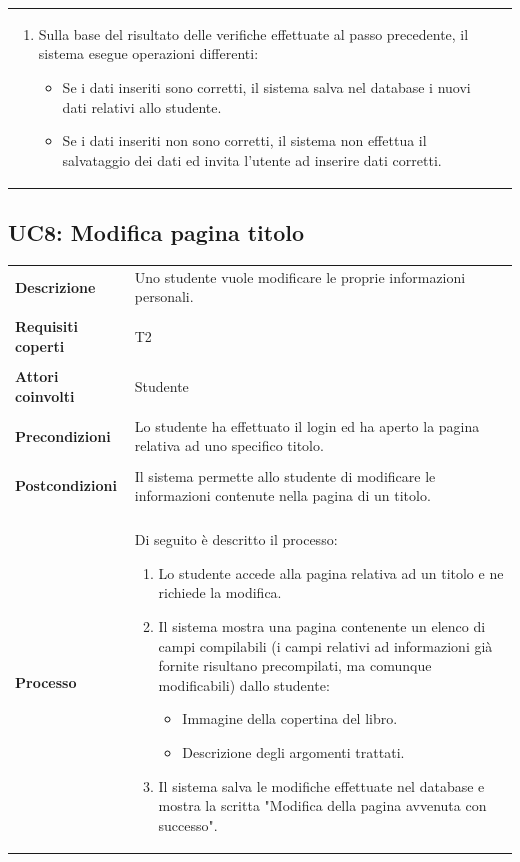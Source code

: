 \documentclass[10pt,a4paper]{article}
\begin{document}
\begin{tabular}{lp{}}
\begin{enumerate}
			\item Sulla base del risultato delle verifiche effettuate al passo precedente, il sistema esegue operazioni differenti:
			\begin{itemize}
				\item Se i dati inseriti sono corretti, il sistema salva nel database i nuovi dati relativi allo studente.
				\item Se i dati inseriti non sono corretti, il sistema non effettua il salvataggio dei dati ed invita l'utente ad inserire dati corretti.
			\end{itemize}
		\end{enumerate}
	\end{tabular}

	\subsection{UC8: Modifica pagina titolo}
	\begin{tabular}{lp{}}
		\textbf{Descrizione}&Uno studente vuole modificare le proprie informazioni personali.\\
		\\
		\textbf{Requisiti coperti}&T2\\
		\\
		\textbf{Attori coinvolti}&Studente\\
		\\
		\textbf{Precondizioni}&Lo studente ha effettuato il login ed ha aperto la pagina relativa ad uno specifico titolo.\\
		\\
		\textbf{Postcondizioni}&Il sistema permette allo studente di modificare le informazioni contenute nella pagina di un titolo.\\
		\\
		\textbf{Processo}&Di seguito è descritto il processo:
		\begin{enumerate}
			\item Lo studente accede alla pagina relativa ad un titolo e ne richiede la modifica.
			\item Il sistema mostra una pagina contenente un elenco di campi compilabili (i campi relativi ad informazioni già fornite risultano precompilati, ma comunque modificabili) dallo studente:
			\begin{itemize}
				\item Immagine della copertina del libro.
				\item Descrizione degli argomenti trattati.
			\end{itemize}
			\item Il sistema salva le modifiche effettuate nel database e mostra la scritta "Modifica della pagina avvenuta con successo".
		\end{enumerate}
	\end{tabular}
\end{document}
